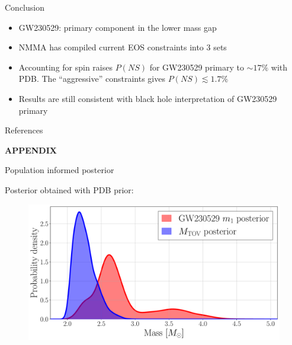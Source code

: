 \documentclass[usenames,dvipsnames,t]{beamer}
\begin{document}
\begin{frame}{Conclusion}

  \def\x{10mm}

  \begin{itemize}
    \item GW230529: primary component in the lower mass gap

    \vspace{\x}

    \item \textsc{NMMA} has compiled current EOS constraints into 3 sets

    \vspace{\x}

    \item Accounting for spin raises $P(NS)$ for GW230529 primary to $\sim 17\%$ with \textsc{PDB}. The ``aggressive'' constraints gives $P(NS) \lesssim 1.7\%$

    \vspace{\x}

    \item Results are still consistent with black hole interpretation of GW230529 primary
  \end{itemize}
  
\end{frame}

\begin{frame}{References}

\printbibliography
    
\end{frame}


\appendix

\begin{frame}
\vfill
\centering
\textbf{APPENDIX}
\vfill
\end{frame}


\begin{frame}{Population informed posterior}

  Posterior obtained with \textsc{PDB} prior:
  \begin{figure}
    \centering
    \includegraphics[width=0.9\linewidth]{Figures/mtov_gw230529_set_L1_pdb.pdf}
  \end{figure}    

\end{frame}
\end{document}

